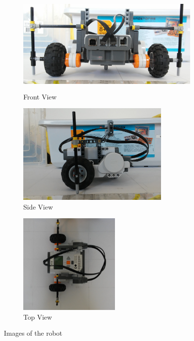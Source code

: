 \documentclass[paper=a4, fontsize=11pt]{scrartcl} %
\numberwithin{equation}{section} %
\numberwithin{figure}{section} %
\numberwithin{table}{section} %
\begin{document}
\begin{figure}[h]
 
\begin{subfigure}{0.5\textwidth}
\includegraphics[width=0.9\linewidth, height=5cm]{front.png} 
\caption{Front View}
\label{fig:sub_front}
\end{subfigure}
\begin{subfigure}{0.5\textwidth}
\includegraphics[width=0.9\linewidth, height=5cm]{side.png}
\caption{Side View}
\label{fig:sub_side}
\end{subfigure}
\begin{subfigure}{0.5\textwidth}
\includegraphics[width=0.9\linewidth, height=5cm]{top.png}
\caption{Top View}
\label{fig:sub_top}
\end{subfigure}
 
\caption{Images of the robot}
\label{fig:robot}
\end{figure}
\end{document}
